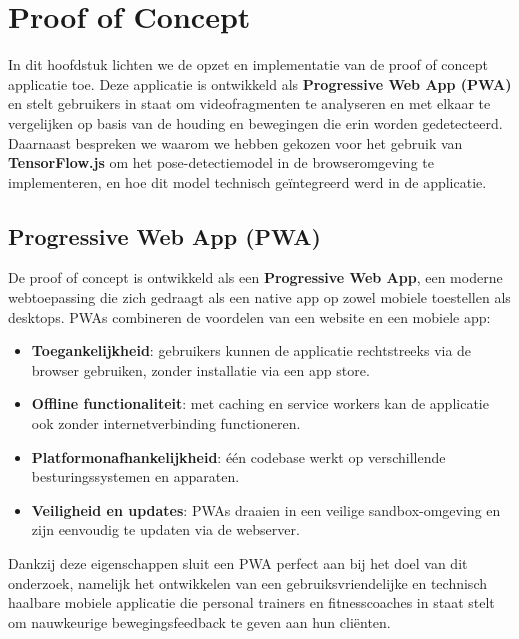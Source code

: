 \chapter{Proof of Concept}
\label{ch:poc}
In dit hoofdstuk lichten we de opzet en implementatie van de proof of concept applicatie toe. 
Deze applicatie is ontwikkeld als \textbf{Progressive Web App (PWA)} en stelt gebruikers in staat om videofragmenten te analyseren en met elkaar te vergelijken op basis van de houding en bewegingen die erin worden gedetecteerd. 
Daarnaast bespreken we waarom we hebben gekozen voor het gebruik van \textbf{TensorFlow.js} om het pose-detectiemodel in de browseromgeving te implementeren, en hoe dit model technisch geïntegreerd werd in de applicatie.

\section{Progressive Web App (PWA)}
De proof of concept is ontwikkeld als een \textbf{Progressive Web App}, een moderne webtoepassing die zich gedraagt als een native app op zowel mobiele toestellen als desktops. 
PWAs combineren de voordelen van een website en een mobiele app:
\begin{itemize}
    \item \textbf{Toegankelijkheid}: gebruikers kunnen de applicatie rechtstreeks via de browser gebruiken, zonder installatie via een app store.
    \item \textbf{Offline functionaliteit}: met caching en service workers kan de applicatie ook zonder internetverbinding functioneren.
    \item \textbf{Platformonafhankelijkheid}: één codebase werkt op verschillende besturingssystemen en apparaten.
    \item \textbf{Veiligheid en updates}: PWAs draaien in een veilige sandbox-omgeving en zijn eenvoudig te updaten via de webserver.
\end{itemize}

Dankzij deze eigenschappen sluit een PWA perfect aan bij het doel van dit onderzoek, namelijk het ontwikkelen van een gebruiksvriendelijke en technisch haalbare mobiele applicatie die personal trainers en fitnesscoaches in staat stelt om nauwkeurige bewegingsfeedback te geven aan hun cliënten.

